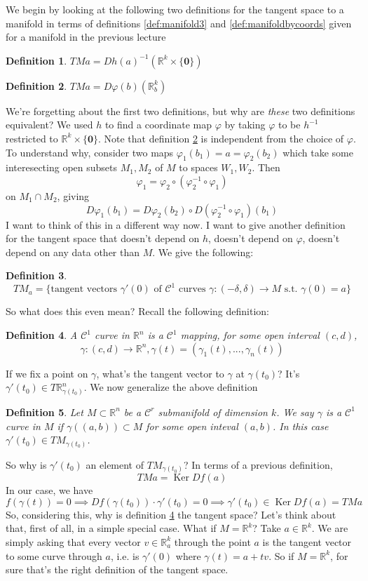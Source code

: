 \documentclass{article}
\newtheorem{definition}{Definition}
\DeclareMathOperator{\Ker}{Ker}
\newcommand{\reals}[0]{\mathbb{R}}
\newcommand{\mc}[1]{\mathcal{#1}}
\newcommand{\mb}[1]{\mathbf{#1}}
\begin{document}
We begin by looking at the following two definitions for the tangent space to a manifold in terms of definitions \ref{def:manifold3} and \ref{def:manifoldbycoords} given for a manifold in the previous lecture
\begin{definition}
  \(TMa = Dh(a)^{-1}(\reals^k \times \{\mb{0}\})\)
\end{definition}
\begin{definition}
  \label{vfdef} \(TMa = D\varphi(b)(\reals^k_b)\)
\end{definition}
We're forgetting about the first two definitions, but why are \textit{these} two definitions equivalent? We used \(h\) to find a coordinate map \(\varphi\) by taking \(\varphi\) to be \(h^{-1}\) restricted to \(\reals^k \times \{\mb{0}\}\). Note that definition \ref{vfdef} is independent from the choice of \(\varphi\). To understand why, consider two maps \(\varphi_1(b_1) = a = \varphi_2(b_2)\) which take some interesecting open subsets \(M_1, M_2\) of \(M\) to spaces \(W_1, W_2\). Then
\[\varphi_1 = \varphi_2 \circ (\varphi_2^{-1} \circ \varphi_1)\]
on \(M_1 \cap M_2\), giving
\[D\varphi_1(b_1) = D\varphi_2(b_2) \circ D(\varphi_2^{-1}\circ\varphi_1)(b_1)\]
I want to think of this in a different way now. I want to give another definition for the tangent space that doesn't depend on \(h\), doesn't depend on \(\varphi\), doesn't depend on any data other than \(M\). We give the following:
\begin{definition}
  \[TM_a = \{\text{tangent vectors } \gamma'(0) \text{ of } \mc{C^1} \text{ curves } \gamma: (-\delta, \delta) \to M \text{ s.t. } \gamma(0) = a\}\]
\end{definition}
So what does this even mean? Recall the following definition:
\begin{definition}
  A \(\mc{C}^1\) curve in \(\reals^n\) is a \(\mc{C}^1\) mapping, for some open interval \((c, d)\),
  \[\gamma: (c, d) \to \reals^n, \gamma(t) = (\gamma_1(t),...,\gamma_n(t))\]
  \label{newdef}
\end{definition}
If we fix a point on \(\gamma\), what's the tangent vector to \(\gamma\) at \(\gamma(t_0)\)? It's \(\gamma'(t_0) \in T\reals^n_{\gamma(t_0)}\). We now generalize the above definition
\begin{definition}
  Let \(M \subset \reals^n\) be a \(\mc{C}^r\) submanifold of dimension \(k\). We say \(\gamma\) is a \(\mc{C}^1\) curve in \(M\) if \(\gamma((a, b)) \subset M\) for some open inteval \((a, b)\). In this case \(\gamma'(t_0) \in TM_{\gamma(t_0)}\).
  \label{c1mcurve}
\end{definition}
So why is \(\gamma'(t_0)\) an element of \(TM_{\gamma(t_0)}\)? In terms of a previous definition,
\[TMa = \Ker Df(a)\]
In our case, we have
\[f(\gamma(t)) = 0 \implies Df(\gamma(t_0)) \cdot \gamma'(t_0) = 0 \implies \gamma'(t_0) \in \Ker Df(a) = TMa\]
So, considering this, why is definition \ref{newdef} the tangent space? Let's think about that, first of all, in a simple special case. What if \(M = \reals^k\)? Take \(a \in \reals^k\). We are simply asking that every vector \(v \in \reals_a^k\) through the point \(a\) is the tangent vector to some curve through \(a\), i.e. is \(\gamma'(0)\) where \(\gamma(t) = a + tv\). So if \(M = \reals^k\), for sure that's the right definition of the tangent space.
\end{document}
